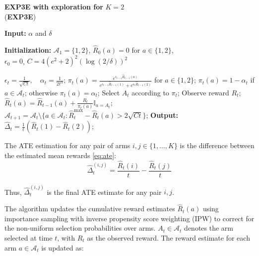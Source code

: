 \begin{algorithm} [H]
\caption{\textbf{EXP3E with exploration for} \( K = 2 \) \\ (\textbf{EXP3E})}
\label{alg:EXP3E}
\textbf{Input:} \( \alpha \) and \( \delta \)

\textbf{Initialization:} \( \mathcal{A}_1 = \{1,2\} \), \( \hat{R}_0(a) = 0 \) for \( a \in \{1,2\} \), \\ 
\hspace{2.5cm} \( \epsilon_0 = 0 \), \( C = 4(e^2 + 2)^2 (\log(2/\delta))^2 \)

\begin{algorithmic}[1]
    \State \( \epsilon_t = \frac{1}{\sqrt{Ct}}, \quad \alpha_t = \frac{1}{2t^\alpha} \);
     
        \State \( \pi_t(a) = \frac{e^{\epsilon_{t-1} \hat{R}_{t-1}(a)}}{e^{\epsilon_{t-1} \hat{R}_{t-1}(1)} + e^{\epsilon_t \hat{R}_{t-1}(2)}} \) for \( a \in \{1,2\} \);
    \Else {}
        \State \( \pi_t(a) = 1 - \alpha_t \) if \( a \in \mathcal{A}_t \); otherwise \( \pi_t(a) = \alpha_t \);
    \EndIf
    \State Select \( A_t \) according to \( \pi_t \);
    \State Observe reward \( R_t \);
        \State \( \hat{R}_t(a) = \hat{R}_{t-1}(a) + \frac{R_t}{\pi_t(a)} \mathbb{I}_{a = A_t} \);
    \EndFor
    \State \( \mathcal{A}_{t+1} = \mathcal{A}_t \setminus \{ a \in \mathcal{A}_t : \hat{R}_t^{\max} - \hat{R}_t(a) > 2\sqrt{Ct} \} \);
    \State \textbf{Output:} \( \hat{\Delta}_t = \frac{1}{t} (\hat{R}_t(1) - \hat{R}_t(2)) \);
\EndFor
\end{algorithmic}
\end{algorithm}

The ATE estimation for any pair of arms \( i, j \in \{1, \dots, K\} \) is the difference between the estimated mean rewards \ref{eq:ate}:
\begin{equation}
\hat{\Delta}_t^{(i,j)} = \frac{\hat{R}_t(i)}{t} - \frac{\hat{R}_t(j)}{t}
\label{eq:ate_estimate}
\end{equation}

Thus, \( \hat{\Delta}_t^{(i,j)} \) is the final ATE estimate for any pair \( i, j \).

The algorithm updates the cumulative reward estimates \( \hat{R}_t(a) \) using importance sampling with inverse propensity score weighting (IPW) to correct for the non-uniform selection probabilities over arms. \( A_t \in \mathcal{A}_t \) denotes the arm selected at time \( t \), with \( R_t \) as the observed reward. The reward estimate for each arm \( a \in \mathcal{A}_t \) is updated as:

